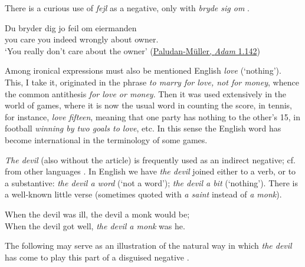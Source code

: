 There is a curious use of \textit{fejl} as a negative, only with \textit{bryde sig om} .

\ea \label{ex:04-163}
\gll Du bryder dig jo feil om eiermanden\\
 you care you indeed wrongly about owner.\DEF{}\\
\glt `You really don't care about the owner'
\hfill(\href{https://books.google.co.jp/books?id=Hm4AAAAAcAAJ&pg=PA142&lpg=PA142&dq=\%22Du+bryder+dig+jo+feil+om+eiermanden\%22&source=bl&ots=OGEV9PHatE&sig=ACfU3U2KQkFsep5hS2e4GQEaQuD8F6EYOw&hl=en&sa=X&ved=2ahUKEwjv9NSwu8-EAxV4hlYBHadyCAQQ6AF6BAgIEAM#v=onepage&q=\%22Du%20bryder%20dig%20jo%20feil%20om%20eiermanden\%22&f=false}{Paludan-Müller, \textit{Adam} 1.142})
\z

Among ironical expressions must also be mentioned English \textit{love} (`nothing'). This, I take it, originated in the phrase \textit{to marry for love, not for money}, whence the common antithesis \textit{for love or money}. Then it was used extensively in the world of games, where it is now the usual word in counting the score, in tennis, for instance, \textit{love fifteen}, meaning that one party has nothing to the other's 15, in football \textit{winning by two goals to love}, etc. In this sense the English word has become international in the terminology of some games.

 \label{sec:the-devil}

\textit{The devil} (also without the article) is frequently used as an indirect negative; cf. from other languages \citet[\href{https://archive.org/details/bub_gb_NQwJAAAAQAAJ/page/n23/mode/2up?q=\%22+teufel+in+der+bette\%22&view=theater}{23f}]{grimm1856uber}. In English we have \textit{the devil} joined either to a verb, or to a substantive: \textit{the devil a word} (`not a word'); \textit{the devil a bit} (`nothing'). There is a well-known little verse  (sometimes quoted with \textit{a saint} instead of \textit{a monk}).

\ea \label{ex:04-164}
When the devil was ill, the devil a monk would be; \\
When the devil got well, \textit{the devil a monk} was he.
\z

\bigskip

The following may serve as an illustration of the natural way in which \textit{the devil} has come to play this part of a disguised negative .

